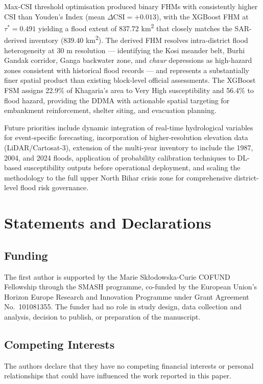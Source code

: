 \documentclass[12pt, a4paper]{article}
\begin{document}
Max-CSI threshold optimisation produced binary FHMs with consistently higher CSI than Youden's Index (mean $\Delta\text{CSI} = +0.013$), with the XGBoost FHM at $\tau^* = 0.491$ yielding a flood extent of 837.72 km\textsuperscript{2} that closely matches the SAR-derived inventory (839.40 km\textsuperscript{2}). The derived FHM resolves intra-district flood heterogeneity at 30 m resolution --- identifying the Kosi meander belt, Burhi Gandak corridor, Ganga backwater zone, and \textit{chaur} depressions as high-hazard zones consistent with historical flood records --- and represents a substantially finer spatial product than existing block-level official assessments. The XGBoost FSM assigns 22.9\% of Khagaria's area to Very High susceptibility and 56.4\% to flood hazard, providing the DDMA with actionable spatial targeting for embankment reinforcement, shelter siting, and evacuation planning.

Future priorities include dynamic integration of real-time hydrological variables for event-specific forecasting, incorporation of higher-resolution elevation data (LiDAR/Cartosat-3), extension of the multi-year inventory to include the 1987, 2004, and 2024 floods, application of probability calibration techniques to DL-based susceptibility outputs before operational deployment, and scaling the methodology to the full upper North Bihar crisis zone for comprehensive district-level flood risk governance.


\section*{Statements and Declarations}

%
%
%
\subsection*{Funding}
The first author is supported by the Marie Sk\l odowska-Curie COFUND Fellowship through the SMASH programme, co-funded by the European Union's Horizon Europe Research and Innovation Programme under Grant Agreement No.\ 101081355. The funder had no role in study design, data collection and analysis, decision to publish, or preparation of the manuscript.

\subsection*{Competing Interests}
The authors declare that they have no competing financial interests or personal relationships that could have influenced the work reported in this paper.
\end{document}
